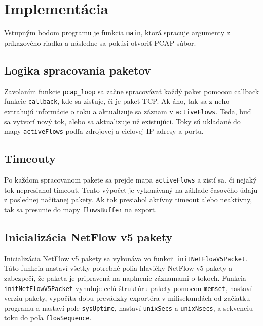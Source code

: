 \documentclass[11pt, a4paper]{article}
\begin{document}
\section{Implementácia}
Vstupným bodom programu je funkcia \texttt{main}, ktorá spracuje argumenty z príkazového riadka a 
následne sa pokúsi otvoriť PCAP súbor.

\subsection*{Logika spracovania paketov}

Zavolaním funkcie \texttt{pcap\_loop} sa začne spracovávať každý paket pomocou callback 
funkcie \texttt{callback}, kde sa zisťuje, či je paket TCP.
Ak áno, tak sa z neho extrahujú informácie o toku a aktualizuje sa záznam v \texttt{activeFlows}.
Teda, buď sa vytvorí nový tok, alebo sa aktualizuje už existujúci. Toky sú ukladané do mapy 
\texttt{activeFlows} podľa zdrojovej a cieľovej IP adresy a portu.

\subsection*{Timeouty}

Po každom spracovanom pakete sa prejde mapa \texttt{activeFlows} a zistí sa, 
či nejaký tok nepresiahol timeout. Tento výpočet je vykonávaný na základe časového údaju 
z poslednej načítanej pakety. Ak tok presiahol aktívny timeout alebo neaktívny,
 tak sa presunie do mapy \texttt{flowsBuffer} na export.

\subsection*{Inicializácia NetFlow v5 pakety}

Inicializácia NetFlow v5 pakety sa vykonáva vo funkcii \texttt{initNetFlowV5Packet}. 
Táto funkcia nastaví všetky potrebné polia hlavičky NetFlow v5 pakety a zabezpečí, že paketa 
je pripravená na naplnenie záznamami o tokoch.
Funkcia \texttt{initNetFlowV5Packet} vynuluje celú štruktúru pakety pomocou \texttt{memset}, 
nastaví verziu pakety, vypočíta dobu prevádzky exportéra v milisekundách od začiatku programu a nastaví pole 
\texttt{sysUptime}, nastaví \texttt{unixSecs} a \texttt{unixNsecs}, a sekvenciu toku do poľa \texttt{flowSequence}.
\end{document}
